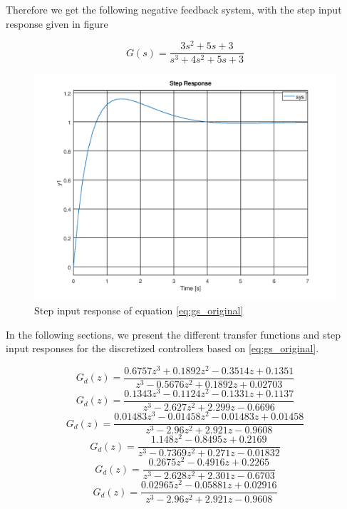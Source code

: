 \documentclass[a4paper, 12pt]{article}
\begin{document}
Therefore we get the following negative feedback system, with the step input response given in figure

\begin{equation}
  G(s) = \frac{3 s^2 + 5s + 3}{s^3 + 4s^2 + 5s + 3}
  \label{eq:gs_original}
\end{equation}

\begin{figure}[H]
  \centering
  \includegraphics[width=.8\textwidth]{./img/2_5_continuous.png}
  \caption{Step input response of equation \eqref{eq:gs_original}}
  \label{fig:2_original}
\end{figure}

In the following sections, we present the different transfer functions and step
input responses for the discretized controllers based on \eqref{eq:gs_original}.


\begin{equation}
  G_d(z) = \frac{0.6757 z^3 + 0.1892 z^2 - 0.3514 z + 0.1351}{z^3 - 0.5676 z^2 + 0.1892 z + 0.02703}
  \label{eq:tustin_1}
\end{equation}
\begin{equation}
  G_d(z) = \frac{0.1343 z^3 - 0.1124 z^2 - 0.1331 z + 0.1137}{z^3 - 2.627 z^2 + 2.299 z - 0.6696}
  \label{eq:tustin_01}
\end{equation}
\begin{equation}
  G_d(z) = \frac{0.01483 z^3 - 0.01458 z^2 - 0.01483 z + 0.01458}{z^3 - 2.96 z^2 + 2.921 z - 0.9608}
  \label{eq:tustin_001}
\end{equation}
\begin{equation}
  G_d(z) = \frac{1.148 z^2 - 0.8495 z + 0.2169}{z^3 - 0.7369 z^2 + 0.271 z - 0.01832}
  \label{eq:mpz_1}
\end{equation}
\begin{equation}
  G_d(z) = \frac{0.2675 z^2 - 0.4916 z + 0.2265}{z^3 - 2.628 z^2 + 2.301 z - 0.6703}
  \label{eq_mpz_01}
\end{equation}
\begin{equation}
  G_d(z) = \frac{0.02965 z^2 - 0.05881 z + 0.02916}{z^3 - 2.96 z^2 + 2.921 z - 0.9608}
  \label{eq:mpz_001}
\end{equation}
\end{document}
